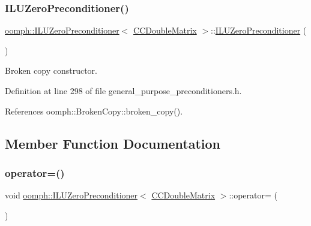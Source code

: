 \subsubsection{\texorpdfstring{I\+L\+U\+Zero\+Preconditioner()}{ILUZeroPreconditioner()}\hspace{0.1cm}{\footnotesize\ttfamily [2/2]}}
{\footnotesize\ttfamily \hyperlink{classoomph_1_1ILUZeroPreconditioner}{oomph\+::\+I\+L\+U\+Zero\+Preconditioner}$<$ \hyperlink{classoomph_1_1CCDoubleMatrix}{C\+C\+Double\+Matrix} $>$\+::\hyperlink{classoomph_1_1ILUZeroPreconditioner}{I\+L\+U\+Zero\+Preconditioner} (\begin{DoxyParamCaption}\item[{const \hyperlink{classoomph_1_1ILUZeroPreconditioner}{I\+L\+U\+Zero\+Preconditioner}$<$ \hyperlink{classoomph_1_1CCDoubleMatrix}{C\+C\+Double\+Matrix} $>$ \&}]{ }\end{DoxyParamCaption})\hspace{0.3cm}{\ttfamily [inline]}}



Broken copy constructor. 



Definition at line 298 of file general\+\_\+purpose\+\_\+preconditioners.\+h.



References oomph\+::\+Broken\+Copy\+::broken\+\_\+copy().



\subsection{Member Function Documentation}
\mbox{\label{classoomph_1_1ILUZeroPreconditioner_3_01CCDoubleMatrix_01_4_a8b5242824978d267f091997895c99b9d}} 
\subsubsection{\texorpdfstring{operator=()}{operator=()}}
{\footnotesize\ttfamily void \hyperlink{classoomph_1_1ILUZeroPreconditioner}{oomph\+::\+I\+L\+U\+Zero\+Preconditioner}$<$ \hyperlink{classoomph_1_1CCDoubleMatrix}{C\+C\+Double\+Matrix} $>$\+::operator= (\begin{DoxyParamCaption}\item[{const \hyperlink{classoomph_1_1ILUZeroPreconditioner}{I\+L\+U\+Zero\+Preconditioner}$<$ \hyperlink{classoomph_1_1CCDoubleMatrix}{C\+C\+Double\+Matrix} $>$ \&}]{ }\end{DoxyParamCaption})\hspace{0.3cm}{\ttfamily [inline]}}



